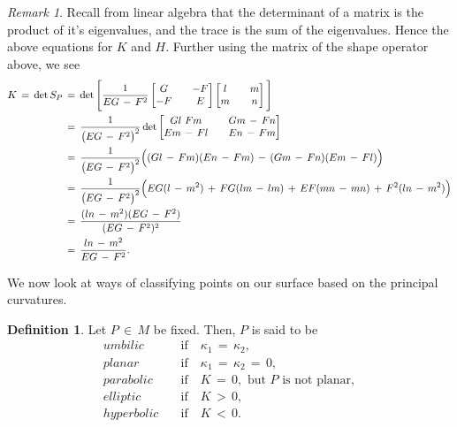 \documentclass{UKZNcomp}
\theoremstyle{definition}
\newtheorem{definition}{Definition}[section]
\theoremstyle{remark}
\newtheorem*{remark}{Remark}
\begin{document}
\begin{remark}
Recall from linear algebra that the determinant of a matrix is the product of it's eigenvalues, and the trace is the sum of the eigenvalues. Hence the above equations for $K$ and $H$. Further using the matrix of the shape operator above, we see
\begin{align*}
K\,=\,\det S_P\,&=\,\det\Bigg[\dfrac{1}{EG\,-\,F^2}
\begin{bmatrix}
G&&-F\\
-F&&E
\end{bmatrix}
\begin{bmatrix}
l&&m\\
m&&n
\end{bmatrix}\Bigg]\\
&=\,\dfrac{1}{\big(EG\,-\,F^2 \big)^2}\det
\begin{bmatrix}
Gl\,\-\,Fm&&Gm\,-\,Fn\\
Em\,-\,Fl&&En\,-\,Fm
\end{bmatrix}\\
&=\,\dfrac{1}{\big(EG\,-\,F^2 \big)^2}\Big((Gl\,-\,Fm)(En\,-\,Fm)\,-\,(Gm\,-\,Fn)(Em\,-\,Fl) \Big)\\
&=\,\dfrac{1}{\big(EG\,-\,F^2 \big)^2}\Big(EG(l\,-\,m^2)\,+\,FG(lm\,-\,lm)\,+\,EF(mn\,-\,mn)\,+\,F^2(ln\,-\,m^2)\Big)\\
&=\,\dfrac{(ln\,-\,m^2)(EG\,-\,F^2)}{(EG\,-\,F^2)^2}\\
&=\,
\dfrac{ln\,-\,m^2}{EG\,-\,F^2}.
\end{align*} 
\end{remark}

We now look at ways of classifying points on our surface based on the principal curvatures.

\begin{definition}
Let $P\,\in\,M$ be fixed. Then, $P$ is said to be
\begin{align*}
umbilic&\quad\text{if}\quad \kappa_1\,=\,\kappa_2,\\
planar&\quad\text{if}\quad \kappa_1\,=\,\kappa_2\,=\,0,\\
parabolic&\quad\text{if}\quad K\,=\,0,\,\,\text{but}\,\,P\,\,\text{is not planar},\\
elliptic&\quad\text{if}\quad K\,>\,0,\\
hyperbolic&\quad\text{if}\quad K\,<\,0.
\end{align*}
\end{definition}
\end{document}
